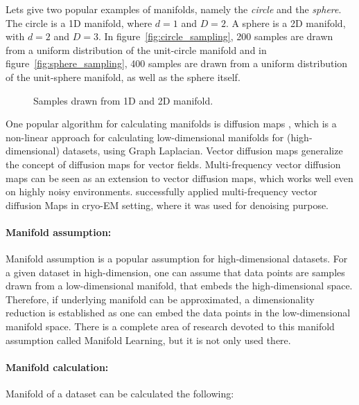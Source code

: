 Lets give two popular examples of manifolds, namely the \textit{circle} and the \textit{sphere}.
The circle is a 1D manifold, where $d=1$ and $D=2$. A sphere is a 2D manifold, with $d=2$ and $D=3$.
In figure~\ref{fig:circle_sampling}, 200 samples are drawn from a uniform distribution of the unit-circle manifold
and in figure~\ref{fig:sphere_sampling}, 400 samples are drawn from a uniform distribution of the unit-sphere manifold,
as well as the sphere itself.

\begin{figure}[H]
    \centering
    \caption{Samples drawn from 1D and 2D manifold.}
\end{figure}

One popular algorithm for calculating manifolds is diffusion maps \cite{diffusionMaps}, 
which is a non-linear approach for calculating low-dimensional manifolds
for (high-dimensional) datasets, using Graph Laplacian.
Vector diffusion maps \cite{vectorDiffusionMaps} generalize the concept of diffusion maps for vector fields.
Multi-frequency vector diffusion maps \cite{multiDiffusionMaps} 
can be seen as an extension to vector diffusion maps, which works well even on highly noisy environments.
\citet{cryoEmMutliDM} successfully applied multi-frequency vector diffusion Maps in cryo-EM setting,
 where it was used for denoising purpose.

\paragraph{Manifold assumption:}
\label{sec:manifoldAssumption}
Manifold assumption is a popular assumption for high-dimensional datasets.
For a given dataset in high-dimension, one can assume that data points are samples drawn from a low-dimensional manifold,
that embeds the high-dimensional space. 
Therefore, if underlying manifold can be approximated, a dimensionality reduction
is established as one can embed the data points in the low-dimensional manifold space.
There is a complete area of research devoted to this manifold assumption called Manifold Learning\cite{ManifoldLearning},
but it is not only used there.

\paragraph{Manifold calculation:}
Manifold of a dataset can be calculated the following:

